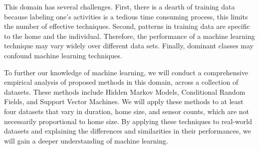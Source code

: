 \documentclass[11pt, oneside]{article}   	%
\begin{document}
	This domain has several challenges.
	First, there is a dearth of training data because labeling one's activities is a tedious time consuming process, this limits the number of effective techniques.
	Second, patterns in training data are specific to the home and the individual.
	Therefore, the performance of a machine learning technique may vary widely over different data sets.
	Finally, dominant classes may confound machine learning techniques.

	To further our knowledge of machine learning, we will conduct a comprehensive empirical analysis of proposed methods in this domain, across a collection of datasets.
	These methods include Hidden Markov Models, Conditional Random Fields, and Support Vector Machines.
	We will apply these methods to at least four datasets that vary in duration, home size, and sensor counts, which are not necessarily proportional to home size.
	By applying these techniques to real-world datasets and explaining the differences and similarities in their performances, we will gain a deeper understanding of machine learning.
\end{document}
